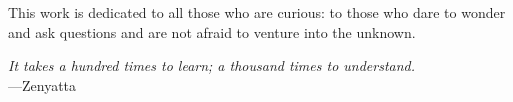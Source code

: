 \documentclass[12pt,chapterheads]{UCMerced}
\begin{document}
\begin{frontmatter}
\makefrontmatter %

%
%


\begin{dedication} %
   This work is dedicated to all those who are curious: to those who dare to wonder and ask questions and are not afraid to venture into the unknown.
   
 \end{dedication}

%   
% 



\begin{epigraph} %
  \emph{It takes a hundred times to learn; a thousand times to understand.}\\
  ---Zenyatta
\end{epigraph}

% 


\end{frontmatter}
\end{document}

